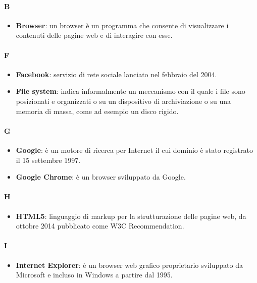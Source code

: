 \paragraph{B}
\begin{itemize}
	\item[] \textbf{Browser}: un browser è un programma che consente di visualizzare i contenuti delle pagine web e di interagire con esse.
\end{itemize}

\newpage


\paragraph{F}
\begin{itemize}
	\item[] \textbf{Facebook}: servizio di rete sociale lanciato nel febbraio del 2004. 

	\item[] \textbf{File system}: indica informalmente un meccanismo con il quale i file sono posizionati e organizzati o su un dispositivo di archiviazione o su una memoria di massa, come ad esempio un disco rigido.
\end{itemize}
\newpage

\paragraph{G}
\begin{itemize}
	\item[] \textbf{Google}: è un motore di ricerca per Internet il cui dominio è stato registrato il 15 settembre 1997.
	\item[] \textbf{Google Chrome}: è un browser sviluppato da Google.
\end{itemize}
\newpage

\paragraph{H}
\begin{itemize}
	\item[] \textbf{HTML5}: linguaggio di markup per la strutturazione delle pagine web, da ottobre 2014 pubblicato come W3C Recommendation.
\end{itemize}
\newpage

\paragraph{I}
\begin{itemize}
	\item[] \textbf{Internet Explorer}: è un browser web grafico proprietario sviluppato da Microsoft e incluso in Windows a partire dal 1995.
\end{itemize}
\newpage



